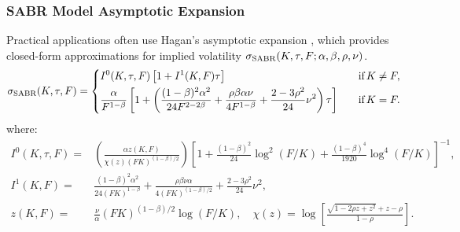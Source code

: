 \documentclass[preprint,12pt]{elsarticle}
\begin{document}
\subsubsection*{SABR Model Asymptotic Expansion}

Practical applications often use Hagan's asymptotic expansion \citep{Hagan2002}, which provides closed-form approximations for implied volatility $\sigma_{\rm SABR}(K, \tau, F; \alpha, \beta, \rho, \nu)$.  
\begin{equation}
\sigma_{\rm SABR}(K,\tau,F)=\left\{
\begin{aligned}
  &I^0(K,\tau,F)\left[1+I^1(K,F)\tau \right] \quad &\text{if}\, K\neq F, \\
    &\frac{\alpha}{F^{1-\beta}}
    \left[
    1+\left(\frac{(1-\beta)^2\alpha^2}{24F^{2-2\beta}}+
    \frac{\rho\beta\alpha\nu}{4F^{1-\beta}}+
    \frac{2-3\rho^2}{24}\nu^2\right)\tau
    \right] \quad &\text{if}\, K= F.
\end{aligned}\right. \label{eq:sabr_detailed}
\end{equation}
where:
\begin{align*}
    I^0(K,\tau,F)=&\left( \frac{\alpha z(K,F)}{\chi(z)(F K)^{(1-\beta)/2}} \right)
        \left[
        1 + \frac{(1-\beta)^2}{24}\log^2 (F/K) +\frac{(1-\beta)^4}{1920}\log^4 (F/K)
        \right]^{-1},\\
        I^1(K,F)=&\frac{(1-\beta)^2\alpha^2}{24(FK)^{1-\beta}}+
        \frac{\rho\beta\nu\alpha}{4(FK)^{(1-\beta)/2}}+\frac{2-3\rho^2}{24}\nu^2,\\
        z(K,F)=&\frac{\nu}{\alpha}(FK)^{(1-\beta)/2}\log (F/K),\quad\chi(z)=\log\left[\frac{\sqrt{1-2\rho z+z^2}+z-\rho}{1-\rho}\right].
\end{align*}
\end{document}
